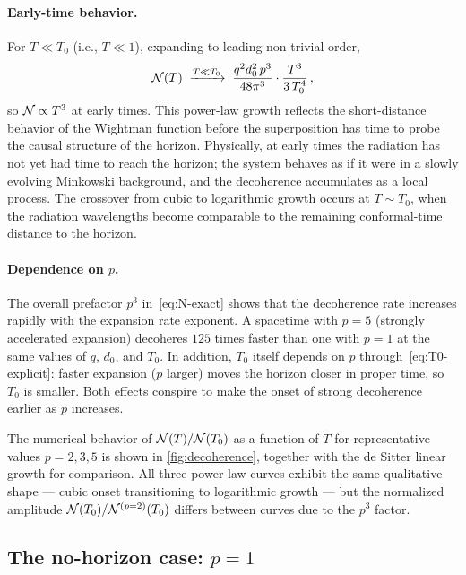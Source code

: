 \paragraph{Early-time behavior.}
For $T \ll T_{0}$ (i.e., $\widetilde{T} \ll 1$), expanding to leading non-trivial
order,
%
\begin{equation}
  \mathcal{N}(T)
  \;\xrightarrow{T \ll T_{0}}\;
  \frac{q^{2}d_{0}^{2}\,p^{3}}{48\pi^{3}}
  \cdot
  \frac{T^{3}}{3\,T_{0}^{4}} \,,
  \label{eq:N-small-T}
\end{equation}
%
so $\mathcal{N} \propto T^{3}$ at early times.  This power-law growth reflects the
short-distance behavior of the Wightman function before the superposition has
time to probe the causal structure of the horizon.  Physically, at early times the
radiation has not yet had time to reach the horizon; the system behaves as if it
were in a slowly evolving Minkowski background, and the decoherence accumulates
as a local process.  The crossover from cubic to logarithmic growth occurs
at $T \sim T_{0}$, when the radiation wavelengths become comparable to the
remaining conformal-time distance to the horizon.

\paragraph{Dependence on $p$.}
The overall prefactor $p^{3}$ in~\cref{eq:N-exact} shows that the decoherence
rate increases rapidly with the expansion rate exponent.  A spacetime with
$p = 5$ (strongly accelerated expansion) decoheres $125$ times faster than one
with $p = 1$ at the same values of $q$, $d_{0}$, and $T_{0}$.  In addition,
$T_{0}$ itself depends on $p$ through~\cref{eq:T0-explicit}: faster expansion
($p$ larger) moves the horizon closer in proper time, so $T_{0}$ is smaller.
Both effects conspire to make the onset of strong decoherence earlier as $p$
increases.

The numerical behavior of $\mathcal{N}(T)/\mathcal{N}(T_{0})$ as a function of $\widetilde{T}$
for representative values $p = 2, 3, 5$ is shown in \cref{fig:decoherence},
together with the de Sitter linear growth for comparison.  All three power-law
curves exhibit the same qualitative shape — cubic onset transitioning to
logarithmic growth — but the normalized amplitude $\mathcal{N}(T_{0})/\mathcal{N}^{(p=2)}(T_{0})$
differs between curves due to the $p^{3}$ factor.

\subsection{The no-horizon case: $p = 1$}
\label{sec:powerlaw-nohorizon}

